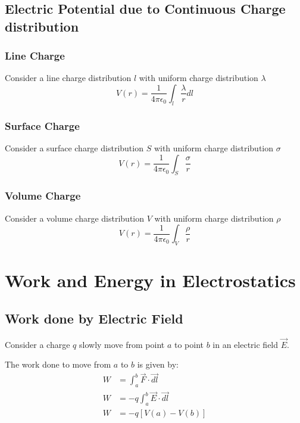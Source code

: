 \documentclass{article}
\begin{document}
\subsection{Electric Potential due to Continuous Charge distribution}
\subsubsection{Line Charge}
Consider a line charge distribution $l$ with uniform charge distribution $\lambda$ \\
\[ V(r) = \frac{1}{4\pi\epsilon_0} \int_{l} \frac{\lambda}{r} dl \]

\subsubsection{Surface Charge}
Consider a surface charge distribution $S$ with uniform charge distribution $\sigma$ \\
\[ V(r) = \frac{1}{4 \pi \epsilon_0} \int_{S} \frac{\sigma}{r} \]

\subsubsection{Volume Charge}
Consider a volume charge distribution $V$ with uniform charge distribution $\rho$ \\
\[  V(r) = \frac{1}{4 \pi \epsilon_0} \int_{V} \frac{\rho}{r} \]

\section{Work and Energy in Electrostatics}
\subsection{Work done by Electric Field}
Consider a charge $q$ slowly move from point $a$ to point $b$ in an electric field $\vec{E}$.\\


The work done to move from $a$ to $b$ is given by:
\begin{align*}
    W &= \int_{a}^{b} \vec{F} \cdot \vec{dl} \\
    W &= -q \int_{a}^{b} \vec{E} \cdot \vec{dl} \\
    W &= -q \left[V(a) - V(b)\right]
\end{align*}
\end{document}
